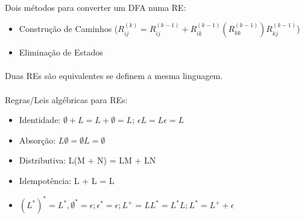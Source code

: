 \documentclass[../resumosTCOM.tex]{subfiles}
\begin{document}
\paragraph{}

Dois métodos para converter um DFA numa RE:
\begin{itemize}
    \item Construção de Caminhos (\(R_{ij}^{(k)} = R_{ij}^{(k-1)} + R_{ik}^{(k-1)}(R_{kk}^{(k-1)})R_{kj}^{(k-1)}\))
    \item Eliminação de Estados
\end{itemize}

\paragraph{}

Duas REs são equivalentes se definem a mesma linguagem.

\paragraph{}

Regras/Leis algébricas para REs:
\begin{itemize}
    \item Identidade: \(\emptyset + L = L + \emptyset = L\); \(\epsilon L = L \epsilon = L\)
    \item Absorção: \(L \emptyset = \emptyset L = \emptyset\)
    \item Distributiva: L(M + N) = LM + LN
    \item Idempotência: L + L = L
    \item \((L^*)^* = L^*, \emptyset^* = \epsilon; \epsilon^* = \epsilon; L^+ = LL^* = L^*L; L^* = L^+ + \epsilon\)
\end{itemize}
\end{document}
